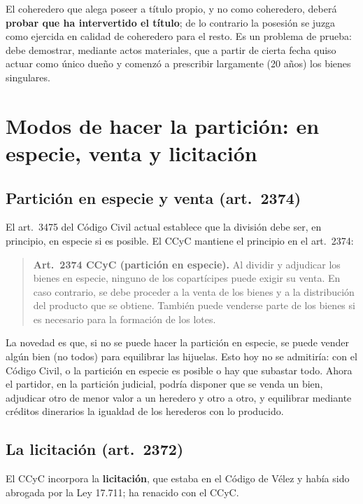 \documentclass[12pt,oneside]{book}
\begin{document}
El coheredero que alega poseer a título propio, y no como coheredero, deberá \textbf{probar que ha intervertido el título}; de lo contrario la posesión se juzga como ejercida en calidad de coheredero para el resto. Es un problema de prueba: debe demostrar, mediante actos materiales, que a partir de cierta fecha quiso actuar como único dueño y comenzó a prescribir largamente (20 años) los bienes singulares.

\section[Modos de hacer la partición: especie, venta y licitación]{Modos de hacer la partición: en especie, venta y licitación}

\subsection{Partición en especie y venta (art.~2374)}

El art.~3475 del Código Civil actual establece que la división debe ser, en principio, en especie si es posible. El CCyC mantiene el principio en el art.~2374:

\begin{quote}
\textbf{Art.~2374 CCyC (partición en especie).} Al dividir y adjudicar los bienes en especie, ninguno de los copartícipes puede exigir su venta. En caso contrario, se debe proceder a la venta de los bienes y a la distribución del producto que se obtiene. También puede venderse parte de los bienes si es necesario para la formación de los lotes.
\end{quote}

La novedad es que, si no se puede hacer la partición en especie, se puede vender algún bien (no todos) para equilibrar las hijuelas. Esto hoy no se admitiría: con el Código Civil, o la partición en especie es posible o hay que subastar todo. Ahora el partidor, en la partición judicial, podría disponer que se venda un bien, adjudicar otro de menor valor a un heredero y otro a otro, y equilibrar mediante créditos dinerarios la igualdad de los herederos con lo producido.

\subsection{La licitación (art.~2372)}

El CCyC incorpora la \textbf{licitación}, que estaba en el Código de Vélez y había sido abrogada por la Ley 17.711; ha renacido con el CCyC.
\end{document}
